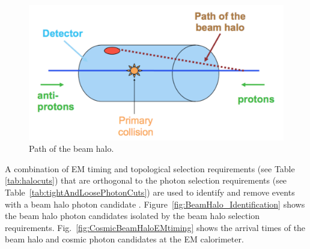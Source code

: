 \begin{figure}[htbm]
 \centering
 \includegraphics[scale=0.65]{./beam_halo_path.pdf}
 \caption{Path of the beam halo.}
 \label{fig:beamHaloPath}
\end{figure}

A combination of EM timing and topological selection requirements (see Table \ref{tab:halocuts}) that are orthogonal to the photon selection requirements (see Table~\ref{tab:tightAndLoosePhotonCuts}) are used to identify and remove events with a beam halo photon candidate \cite{ cdfnote:7960, cdfnote:8409}. Figure~\ref{fig:BeamHalo_Identification} shows the beam halo photon candidates isolated by the beam halo selection requirements. Fig.~\ref{fig:CosmicBeamHaloEMtiming} shows the arrival times of the beam halo and cosmic photon candidates at the EM calorimeter.


